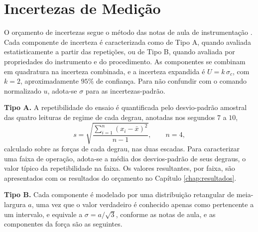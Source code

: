 \section{Incertezas de Medição}
\label{sec:incertezas}

O orçamento de incertezas segue o método das notas de aula de instrumentação
\cite{braga_instr_incerteza}. Cada componente de incerteza é caracterizada como de Tipo A,
quando avaliada estatisticamente a partir das repetições, ou de Tipo B, quando avaliada por
propriedades do instrumento e do procedimento. As componentes se combinam em quadratura na incerteza
combinada, e a incerteza expandida é $U = k\,\sigma_c$, com $k = 2$, aproximadamente $95\%$
de confiança. Para não confundir com o comando normalizado $u$, adota-se $\sigma$ para as
incertezas-padrão.

\textbf{Tipo A.} A repetibilidade do ensaio é quantificada pelo desvio-padrão amostral das
quatro leituras de regime de cada degrau, anotadas nos segundos $7$ a $10$,
\begin{equation}\label{eq:tipo_a}
s = \sqrt{\frac{\sum_{i=1}^{n}(x_i - \bar{x})^2}{n - 1}},
\qquad n = 4,
\end{equation}
calculado sobre as forças de cada degrau, nas duas escadas. Para caracterizar uma faixa de
operação, adota-se a média dos desvios-padrão de seus degraus, o valor típico da
repetibilidade na faixa. Os valores resultantes, por faixa, são apresentados com os
resultados do orçamento no Capítulo \ref{chap:resultados}.

\textbf{Tipo B.} Cada componente é modelado por uma distribuição retangular de meia-largura
$a$, uma vez que o valor verdadeiro é conhecido apenas como pertencente a um intervalo, e
equivale a $\sigma = a/\sqrt{3}$, conforme as notas de aula, e as componentes da força
são as seguintes.

